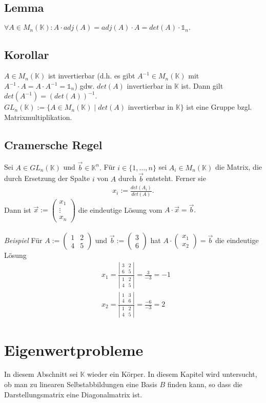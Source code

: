 \documentclass[titlepage]{article}
\newcommand{\K}{\mathbb{K}}
\newcommand{\1}{\mathbb{1}}
\newcommand{\0}{\mathbb{0}}
\newcommand{\smallMatrixZ}[4]{\left(\begin{smallmatrix}#1&#2\\#3&#4\end{smallmatrix}\right)}
\newcommand{\smallDetZ}[4]{\left|\begin{smallmatrix}#1&#2\\#3&#4\end{smallmatrix}\right|}
\newcommand{\vecZ}[2]{\left(\begin{smallmatrix}#1\\#2\end{smallmatrix}\right)}
\begin{document}
			\subsection{Lemma}
				$\forall A\in M_n(\K):A\cdot adj(A)=adj(A)\cdot A=det(A)\cdot\1_n.$
			\subsection{Korollar}
				$A\in M_n(\K)$ ist invertierbar (d.h. es gibt $A^{-1}\in M_n(\K)$ mit $A^{-1}\cdot A=A\cdot A^{-1}=\1_n$) gdw. $det(A)$ invertierbar in $\K$ ist. Dann gilt $det(A^{-1})=(det(A))^{-1}.$ $GL_n(\K):=\{A\in M_n(\K)\mid det(A)\text{ invertierbar in }\K\}$ ist eine Gruppe bzgl. Matrixmultiplikation.
			\subsection{Cramersche Regel}
				Sei $A\in GL_n(\K)$ und $\vec{b}\in\K^n.$ Für $i\in\{1,\dots,n\}$ sei $A_i\in M_n(\K)$ die Matrix, die durch Ersetzung der Spalte $i$ von $A$ durch $\vec{b}$ entsteht. Ferner sie
				\begin{align*}
					x_i:=\frac{det(A_i)}{det(A)}.
				\end{align*}
				Dann ist $\vec{x}:=\left(\begin{smallmatrix}x_1\\\vdots\\x_n\end{smallmatrix}\right)$ die eindeutige Lösung vom $A\cdot\vec{x}=\vec{b}.$\\\\
				\textit{Beispiel} Für $A:=\smallMatrixZ{1}{2}{4}{5}$ und $\vec{b}:=\vecZ{3}{6}$ hat $A\cdot\vecZ{x_1}{x_2}=\vec{b}$ die eindeutige Lösung
				\begin{align*}
					&x_1=\frac{\smallDetZ{3}{2}{6}{5}}{\smallDetZ{1}{2}{4}{5}}=\frac{3}{-3}=-1\\
					&x_2=\frac{\smallDetZ{1}{3}{4}{6}}{\smallDetZ{1}{2}{4}{5}}=\frac{-6}{-3}=2
				\end{align*}
		\section{Eigenwertprobleme}
			In diesem Abschnitt sei $\K$ wieder ein Körper. In diesem Kapitel wird untersucht, ob man zu linearen Selbstabbildungen eine Basis $B$ finden kann, so dass die Darstellungsmatrix eine Diagonalmatrix ist.
\end{document}
